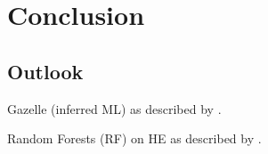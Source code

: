 \chapter{Conclusion}
\label{chap:conclusion}

\section{Outlook}

Gazelle (inferred ML) as described by \cite{2018-gazelle}.

Random Forests (RF) on HE as described by \cite{2020-cryptotree}.
